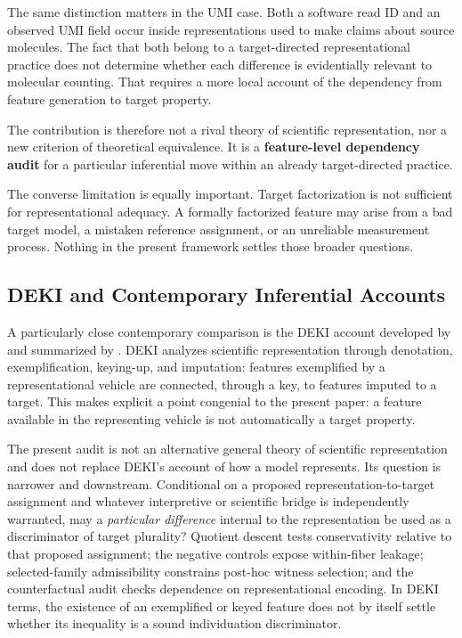 \documentclass[12pt]{article}
\begin{document}
The same distinction matters in the UMI case. Both a software read ID and an observed UMI field occur inside representations used to make claims about source molecules. The fact that both belong to a target-directed representational practice does not determine whether each difference is evidentially relevant to molecular counting. That requires a more local account of the dependency from feature generation to target property.

The contribution is therefore not a rival theory of scientific representation, nor a new criterion of theoretical equivalence. It is a \textbf{feature-level dependency audit} for a particular inferential move within an already target-directed practice.

The converse limitation is equally important. Target factorization is not sufficient for representational adequacy. A formally factorized feature may arise from a bad target model, a mistaken reference assignment, or an unreliable measurement process. Nothing in the present framework settles those broader questions.

\subsection{DEKI and Contemporary Inferential Accounts}

A particularly close contemporary comparison is the DEKI account developed by \citet{FriggNguyen2020ModellingNature} and summarized by \citet{NguyenFrigg2022ScientificRepresentation}. DEKI analyzes scientific representation through denotation, exemplification, keying-up, and imputation: features exemplified by a representational vehicle are connected, through a key, to features imputed to a target. This makes explicit a point congenial to the present paper: a feature available in the representing vehicle is not automatically a target property.

The present audit is not an alternative general theory of scientific representation and does not replace DEKI's account of how a model represents. Its question is narrower and downstream. Conditional on a proposed representation-to-target assignment and whatever interpretive or scientific bridge is independently warranted, may a \emph{particular difference} internal to the representation be used as a discriminator of target plurality? Quotient descent tests conservativity relative to that proposed assignment; the negative controls expose within-fiber leakage; selected-family admissibility constrains post-hoc witness selection; and the counterfactual audit checks dependence on representational encoding. In DEKI terms, the existence of an exemplified or keyed feature does not by itself settle whether its inequality is a sound individuation discriminator.
\end{document}
